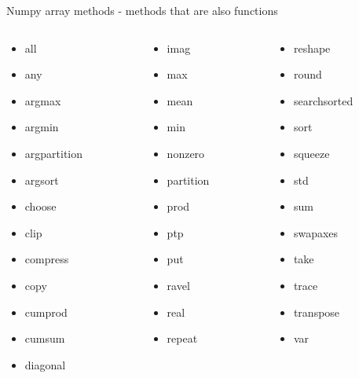 \documentclass[10pt]{beamer}
\begin{document}
\begin{frame}{Numpy array methods - methods that are also functions}
\begin{columns}
\begin{column}{0.3\textwidth}
\begin{itemize}
\item all
\item any
\item argmax
\item argmin
\item argpartition
\item argsort
\item choose
\item clip
\item compress
\item copy
\item cumprod
\item cumsum
\item diagonal
\end{itemize}

\end{column}
\begin{column}{0.3\textwidth} 
\begin{itemize}
\item imag
\item max
\item mean
\item min
\item nonzero
\item partition
\item prod
\item ptp 
\item put
\item ravel
\item real
\item repeat
\end{itemize}
\end{column}
\begin{column}{0.3\textwidth} 
\begin{itemize}
\item reshape
\item round
\item searchsorted
\item sort
\item squeeze
\item std
\item sum
\item swapaxes
\item take
\item trace
\item transpose
\item var
\end{itemize}
\end{column}
\end{columns}
\end{frame}
\end{document}
